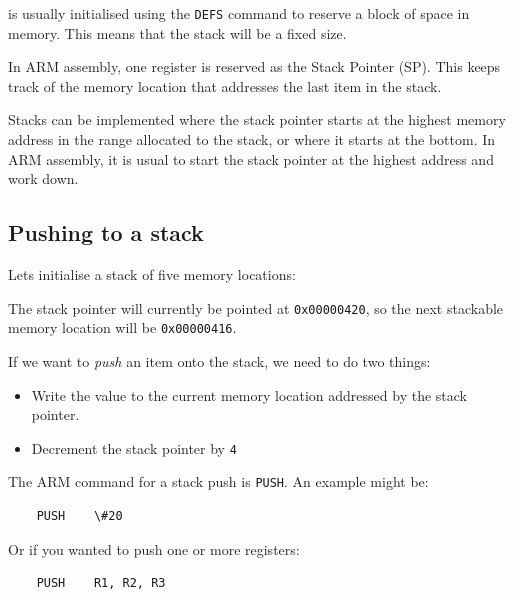 is usually initialised using the {\tt DEFS} command to reserve a block of space
in memory. This means that the stack will be a fixed size.

In ARM assembly, one register is reserved as the Stack Pointer (SP). This keeps
track of the memory location that addresses the last item in the stack.

Stacks can be implemented where the stack pointer starts at the highest memory
address in the range allocated to the stack, or where it starts at the bottom.
In ARM assembly, it is usual to start the stack pointer at the highest address
and work down.

\subsection{Pushing to a stack}

Lets initialise a stack of five memory locations:

\begin{center}
\begin{drawstack}
		
		
		
		
		
\end{drawstack}
\end{center}

The stack pointer will currently be pointed at {\tt 0x00000420}, so the next
stackable memory location will be {\tt 0x00000416}.

If we want to {\it push} an item onto the stack, we need to do two things:

\begin{itemize}

	\item Write the value to the current memory location addressed by the stack pointer.

	\item Decrement the stack pointer by {\tt 4}

\end{itemize}

The ARM command for a stack push is {\tt PUSH}. An example might be:

\begin{verbatim}
	PUSH 	\#20
\end{verbatim}

Or if you wanted to push one or more registers:

\begin{verbatim}
	PUSH 	R1, R2, R3
\end{verbatim}

